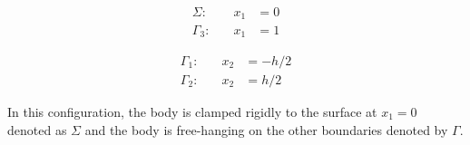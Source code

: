 \documentclass[../../main.tex]{subfiles}
\begin{document}
\noindent\begin{minipage}{.5\linewidth}
	\begin{eqnarray*}
		\Sigma:& \quad x_1 &= 0\\
		\Gamma_3:& \quad x_1 &= 1
	\end{eqnarray*}
\end{minipage}%
\begin{minipage}{.5\linewidth}
	\begin{eqnarray*}
		\Gamma_1:& \quad x_2 &= -{h}/{2}\\
		\Gamma_2:& \quad x_2 &= {h}/{2}
	\end{eqnarray*}
\end{minipage}

In this configuration, the body is clamped rigidly to the surface at $x_1 = 0$ denoted as $\Sigma$ and the body is free-hanging on the other boundaries denoted by $\Gamma$.
\end{document}

